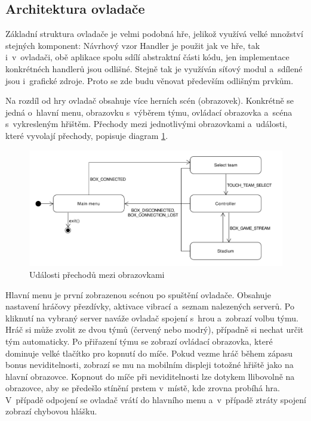 \documentclass[thesis=B,czech,hidelinks]{FITthesis}[2012/06/26] %
\begin{document}
\subsection{Architektura ovladače}

Základní struktura ovladače je velmi podobná hře, jelikož využívá velké množství stejných komponent: Návrhový vzor Handler je použit jak ve hře, tak i~v~ovladači, obě aplikace spolu sdílí abstraktní části kódu, jen implementace konkrétnéch handlerů jsou odlišné. Stejně tak je využíván síťový modul a~sdílené jsou i~grafické zdroje. Proto se zde budu věnovat především odlišným prvkům.

Na rozdíl od hry ovladač obsahuje více herních scén (obrazovek). Konkrétně se jedná o~hlavní menu, obrazovku s~výběrem týmu, ovládací obrazovka a~scéna s~vykresleným hřištěm. Přechody mezi jednotlivými obrazovkami a~události, které vyvolají přechody, popisuje diagram \ref{picture:controller_scenes}.

\begin{figure}[h]
\includegraphics[width=\textwidth]{controller_scenes}
\caption{Události přechodů mezi obrazovkami}
\label{picture:controller_scenes}
\end{figure}


Hlavní menu je první zobrazenou scénou po spuštění ovladače. Obsahuje nastavení hráčovy přezdívky, aktivace vibrací a~seznam nalezených serverů. Po kliknutí na vybraný server naváže ovladač spojení s~hrou a~zobrazí volbu týmu. Hráč si může zvolit ze dvou týmů (červený nebo modrý), případně si nechat určit tým automaticky. Po přiřazení týmu se zobrazí ovládací obrazovka, které dominuje velké tlačítko pro kopnutí do míče. Pokud vezme hráč během zápasu bonus neviditelnosti, zobrazí se mu na mobilním displeji totožné hřiště jako na hlavní obrazovce. Kopnout do míče při neviditelnosti lze dotykem llibovolně na obrazovce, aby se předešlo stínění prstem v~místě, kde zrovna probíhá hra. V~případě odpojení se ovladač vrátí do hlavního menu a~v~případě ztráty spojení zobrazí chybovou hlášku.
\end{document}
